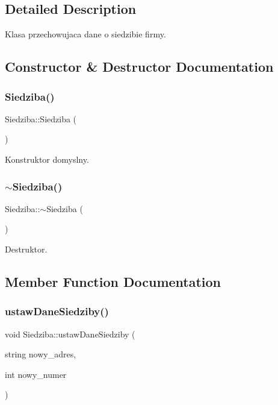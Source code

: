 \subsection{Detailed Description}
Klasa przechowujaca dane o siedzibie firmy. 

\subsection{Constructor \& Destructor Documentation}
\mbox{\label{class_siedziba_a3d2babb95b8eae60c04eb73c9db0981c}} 
\subsubsection{Siedziba()}
{\footnotesize\ttfamily Siedziba\+::\+Siedziba (\begin{DoxyParamCaption}{ }\end{DoxyParamCaption})}



Konstruktor domyslny. 

\mbox{\label{class_siedziba_a1dc3fee9549a390981000aa8df28ee1e}} 
\subsubsection{$\sim$\+Siedziba()}
{\footnotesize\ttfamily Siedziba\+::$\sim$\+Siedziba (\begin{DoxyParamCaption}{ }\end{DoxyParamCaption})}



Destruktor. 



\subsection{Member Function Documentation}
\mbox{\label{class_siedziba_a43a381bfd9f56e65174998606f3919c4}} 
\subsubsection{ustaw\+Dane\+Siedziby()}
{\footnotesize\ttfamily void Siedziba\+::ustaw\+Dane\+Siedziby (\begin{DoxyParamCaption}\item[{string}]{nowy\+\_\+adres,  }\item[{int}]{nowy\+\_\+numer }\end{DoxyParamCaption})}



